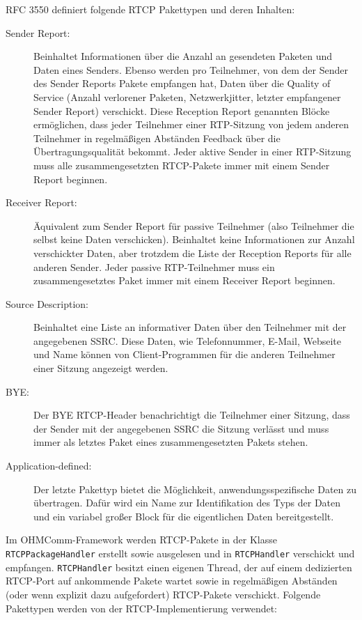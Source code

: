 RFC 3550 definiert folgende RTCP Pakettypen und deren Inhalten:
\begin{description}
\item[Sender Report:] Beinhaltet Informationen über die Anzahl an gesendeten Paketen und Daten eines Senders. Ebenso werden pro Teilnehmer, von dem der Sender des Sender Reports Pakete empfangen hat, Daten über die Quality of Service (Anzahl verlorener Paketen, Netzwerkjitter, letzter empfangener Sender Report) verschickt. Diese Reception Report genannten Blöcke ermöglichen, dass jeder Teilnehmer einer RTP-Sitzung von jedem anderen Teilnehmer in regelmäßigen Abständen Feedback über die Übertragungsqualität bekommt. Jeder aktive Sender in einer RTP-Sitzung muss alle zusammengesetzten RTCP-Pakete immer mit einem Sender Report beginnen.
\item[Receiver Report:] Äquivalent zum Sender Report für passive Teilnehmer (also Teilnehmer die selbst keine Daten verschicken). Beinhaltet keine Informationen zur Anzahl verschickter Daten, aber trotzdem die Liste der Reception Reports für alle anderen Sender. Jeder passive RTP-Teilnehmer muss ein zusammengesetztes Paket immer mit einem Receiver Report beginnen.
\item[Source Description:] Beinhaltet eine Liste an informativer Daten über den Teilnehmer mit der angegebenen SSRC. Diese Daten, wie Telefonnummer, E-Mail, Webseite und Name können von Client-Programmen für die anderen Teilnehmer einer Sitzung angezeigt werden.
\item[BYE:] Der BYE RTCP-Header benachrichtigt die Teilnehmer einer Sitzung, dass der Sender mit der angegebenen SSRC die Sitzung verlässt und muss immer als letztes Paket eines zusammengesetzten Pakets stehen.
\item[Application-defined:] Der letzte Pakettyp bietet die Möglichkeit, anwendungsspezifische Daten zu übertragen. Dafür wird ein Name zur Identifikation des Typs der Daten und ein variabel großer Block für die eigentlichen Daten bereitgestellt.
\end{description}
Im OHMComm-Framework werden RTCP-Pakete in der Klasse \texttt{RTCPPackage\-Handler} erstellt sowie ausgelesen und in \texttt{RTCPHandler} verschickt und empfangen. \texttt{RTCPHandler} besitzt einen eigenen Thread, der auf einem dedizierten RTCP-Port auf ankommende Pakete wartet sowie in regelmäßigen Abständen (oder wenn explizit dazu aufgefordert) RTCP-Pakete verschickt. Folgende Pakettypen werden von der RTCP-Implementierung verwendet:
\\

